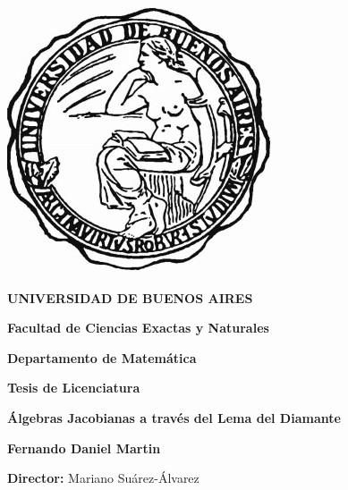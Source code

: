 
\thispagestyle{empty}

\begin {center}

\includegraphics[scale=.3]{uba2.jpg}

\medskip
\textbf{UNIVERSIDAD DE BUENOS AIRES}

\smallskip

\textbf{Facultad de Ciencias Exactas y Naturales}

\smallskip

\textbf{Departamento de Matem\'atica}

\vspace{3.5cm}

\textbf{\large Tesis de Licenciatura}


\vspace{1.5cm}

\textbf{\LARGE Álgebras Jacobianas a través del Lema del Diamante}

\vspace{1.5cm}


\textbf{\large Fernando Daniel Martin}

\end {center}


\vspace{1.5cm}

\noindent \textbf{Director:} Mariano Su\'arez-\'Alvarez


\vspace{3cm}



